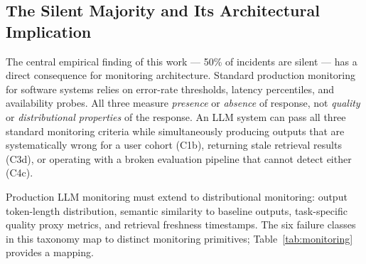 \documentclass{article}
\begin{document}
\subsection{The Silent Majority and Its Architectural Implication}

The central empirical finding of this work --- 50\% of incidents are silent ---
has a direct consequence for monitoring architecture.  Standard production
monitoring for software systems relies on error-rate thresholds, latency
percentiles, and availability probes.  All three measure \emph{presence} or
\emph{absence} of response, not \emph{quality} or \emph{distributional
properties} of the response.  An LLM system can pass all three standard
monitoring criteria while simultaneously producing outputs that are
systematically wrong for a user cohort (C1b), returning stale retrieval results
(C3d), or operating with a broken evaluation pipeline that cannot detect either
(C4c).

Production LLM monitoring must extend to distributional monitoring: output
token-length distribution, semantic similarity to baseline outputs,
task-specific quality proxy metrics, and retrieval freshness timestamps.
The six failure classes in this taxonomy map to distinct monitoring primitives;
Table~\ref{tab:monitoring} provides a mapping.

\begin{table}[t]
\caption{Recommended monitoring primitives per failure class.}
\label{tab:monitoring}
\centering
\small
{}
\end{table}
\end{document}

